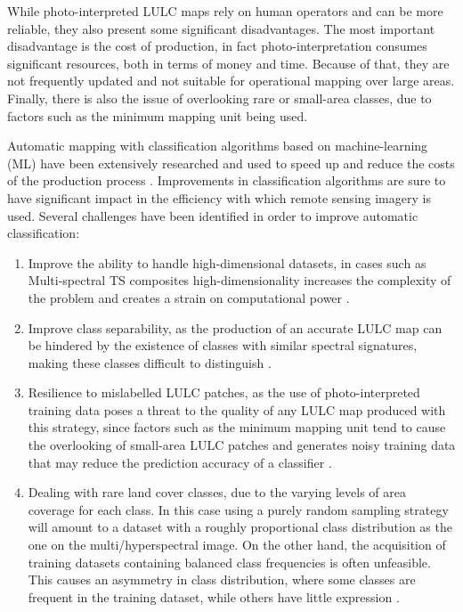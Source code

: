 \documentclass[preprint,12pt]{elsarticle}
\begin{document}
While photo-interpreted LULC maps rely on human operators and can be more
reliable, they also present some significant disadvantages. The most important
disadvantage is the cost of production, in fact photo-interpretation consumes
significant resources, both in terms of money and time. Because of that, they
are not frequently updated and not suitable for operational mapping over large
areas.  Finally, there is also the issue of overlooking rare or small-area
classes, due to factors such as the minimum mapping unit being used.

Automatic mapping with classification algorithms based on machine-learning
(ML) have been extensively researched and used to speed up and reduce the
costs of the production process \cite{Khatami2016, Gavade2019,
Kaur2019}. Improvements in classification algorithms are sure to have
significant impact in the efficiency with which remote sensing imagery is
used. Several challenges have been identified in order to improve automatic
classification:

\begin{enumerate}
    \item Improve the ability to handle high-dimensional datasets, in cases
        such as Multi-spectral TS composites high-dimensionality increases the
        complexity of the problem and creates a strain on computational power
        \cite{Stromann2020}.
    \item Improve class separability, as the production of an accurate LULC map
        can be hindered by the existence of classes with similar spectral
        signatures, making these classes difficult to distinguish
        \cite{Alonso-Sarria2019}.
    \item Resilience to mislabelled LULC patches, as the use of
        photo-interpreted training data poses a threat to the quality of any
        LULC map produced with this strategy, since factors such as the minimum
        mapping unit tend to cause the overlooking of small-area LULC patches
        and generates noisy training data that may reduce the prediction
        accuracy of a classifier \cite{Pelletier2017}.
    \item Dealing with rare land cover classes, due to the varying levels of
        area coverage for each class. In this case using a purely random
        sampling strategy will amount to a dataset with a roughly proportional
        class distribution as the one on the multi/hyperspectral
        image. On the other hand, the acquisition of training
        datasets containing balanced class frequencies is often unfeasible.
        This causes an asymmetry in class distribution, where some classes are
        frequent in the training dataset, while others have little expression
        \cite{Wang2019, Feng2019}.
\end{enumerate}
\end{document}
